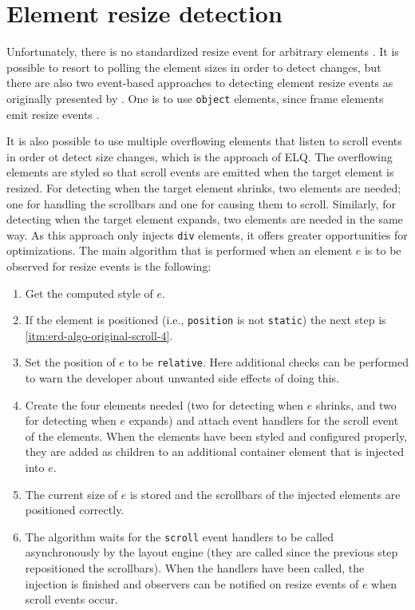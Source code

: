 \documentclass[sigplan,9pt]{acmart}
\newcommand{\elq}{ELQ}
\newcommand{\code}[1]{\texttt{#1}}
\begin{document}
  \section{Element resize detection}\label{sec:imp}
    Unfortunately, there is no standardized resize event for arbitrary elements \cite{w3c_dom2_events}.
    It is possible to resort to polling the element sizes in order to detect changes, but there are also two event-based approaches to detecting element resize events as originally presented by \cite{backalley}.
    One is to use \code{object} elements, since frame elements emit resize events \cite{elq-thesis}.

    It is also possible to use multiple overflowing elements that listen to scroll events in order ot detect size changes, which is the approach of \elq{}.
    The overflowing elements are styled so that scroll events are emitted when the target element is resized.
    For detecting when the target element shrinks, two elements are needed; one for handling the scrollbars and one for causing them to scroll.
    Similarly, for detecting when the target element expands, two elements are needed in the same way.
    As this approach only injects \code{div} elements, it offers greater opportunities for optimizations.
    The main algorithm that is performed when an element $e$ is to be observed for resize events is the following:
    \begin{enumerate}
      \item\label{itm:erd-algo-original-scroll-1} Get the computed style of $e$.
      \item\label{itm:erd-algo-original-scroll-2} If the element is positioned (i.e., \code{position} is not \code{static}) the next step is \ref{itm:erd-algo-original-scroll-4}.
      \item\label{itm:erd-algo-original-scroll-3} Set the position of $e$ to be \code{relative}. Here additional checks can be performed to warn the developer about unwanted side effects of doing this.
      \item\label{itm:erd-algo-original-scroll-4} Create the four elements needed (two for detecting when $e$ shrinks, and two for detecting when $e$ expands) and attach event handlers for the scroll event of the elements.
                                                  When the elements have been styled and configured properly, they are added as children to an additional container element that is injected into $e$.
      \item\label{itm:erd-algo-original-scroll-5} The current size of $e$ is stored and the scrollbars of the injected elements are positioned correctly.
      \item\label{itm:erd-algo-original-scroll-6} The algorithm waits for the \code{scroll} event handlers to be called asynchronously by the layout engine (they are called since the previous step repositioned the scrollbars).
                                                  When the handlers have been called, the injection is finished and observers can be notified on resize events of $e$ when scroll events occur.
    \end{enumerate}
\end{document}
